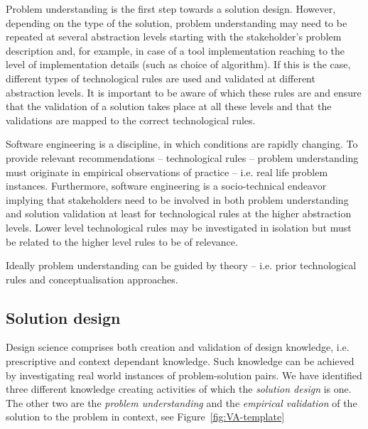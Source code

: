 \documentclass[graybox]{svmult}
\begin{document}

Problem understanding is the first step towards a solution design. However, depending on the type of the solution, problem understanding may need to be repeated at several abstraction levels starting with the stakeholder's problem description and, for example, in case of a tool implementation reaching to the level of implementation details (such as  choice of algorithm). If this is the case, different types of technological rules are used and validated at different abstraction levels. It is important to be aware of which these rules are and ensure that the validation of a solution takes place at all these levels and that the validations are mapped to the correct technological rules. 

Software engineering is a discipline, in which conditions are rapidly changing. To provide relevant recommendations -- technological rules -- problem understanding must originate in empirical observations of practice -- i.e. real life problem instances. Furthermore, software engineering is a socio-technical endeavor implying that stakeholders need to be involved in both problem understanding and solution validation at least for technological rules at the higher abstraction levels. Lower level technological rules may be investigated in isolation but must be related to the higher level rules to be of relevance. 


Ideally problem understanding can be guided by theory -- i.e. prior technological rules and conceptualisation approaches. 



\subsection{Solution design}


Design science comprises both creation and validation of design knowledge, i.e. prescriptive and context dependant knowledge. Such knowledge can be achieved by investigating real world instances of problem-solution pairs. We have identified three different knowledge creating activities of which the \emph{solution design} is one. The other two are the \emph{problem understanding} and the \emph{empirical validation} of the solution to the problem in context, see Figure~\ref{fig:VA-template}
\end{document}
